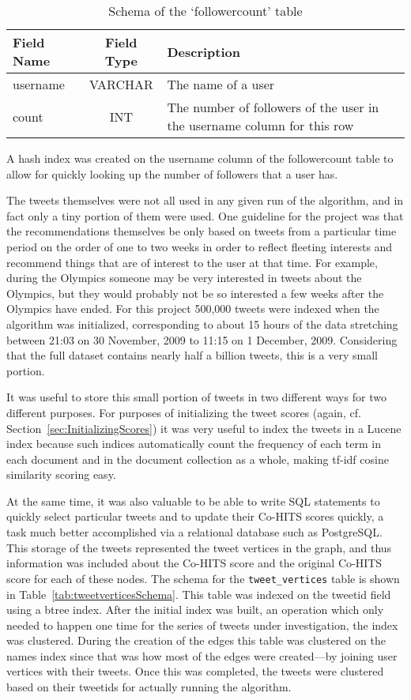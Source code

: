 \begin{table}
\centering
\begin{tabular}{l|c|p{8cm}}
{\bf Field Name} & {\bf Field Type} & {\bf Description} \\ \hline
username & VARCHAR & The name of a user \\ \hline
count & INT & The number of followers of the user in the username column for this row \\
\end{tabular}
\caption{Schema of the `followercount' table}
\label{tab:followercountSchema}
\end{table}

\noindent
A hash index was created on the username column of the followercount table to allow for quickly looking up the number of followers that a user has.


The tweets themselves were not all used in any given run of the algorithm, and in fact only a tiny portion of them were used. One guideline for the project was that the recommendations themselves be only based on tweets from a particular time period on the order of one to two weeks in order to reflect fleeting interests and recommend things that are of interest to the user at that time. For example, during the Olympics someone may be very interested in tweets about the Olympics, but they would probably not be so interested a few weeks after the Olympics have ended. For this project 500,000 tweets were indexed when the algorithm was initialized, corresponding to about 15 hours of the data stretching between 21:03 on 30 November, 2009 to 11:15 on 1 December, 2009. Considering that the full dataset contains nearly half a billion tweets, this is a very small portion.

It was useful to store this small portion of tweets in two different ways for two different purposes. For purposes of initializing the tweet scores (again, cf. Section~\ref{sec:InitializingScores}) it was very useful to index the tweets in a Lucene index because such indices automatically count the frequency of each term in each document and in the document collection as a whole, making tf-idf cosine similarity scoring easy.

At the same time, it was also valuable to be able to write SQL statements to quickly select particular tweets and to update their Co-HITS scores quickly, a task much better accomplished via a relational database such as PostgreSQL. This storage of the tweets represented the tweet vertices in the graph, and thus information was included about the Co-HITS score and the original Co-HITS score for each of these nodes. The schema for the \texttt{tweet\_vertices} table is shown in Table~\ref{tab:tweetverticesSchema}. This table was indexed on the tweetid field using a btree index. After the initial index was built, an operation which only needed to happen one time for the series of tweets under investigation, the index was clustered. During the creation of the edges this table was clustered on the names index since that was how most of the edges were created---by joining user vertices with their tweets. Once this was completed, the tweets were clustered based on their tweetids for actually running the algorithm.

